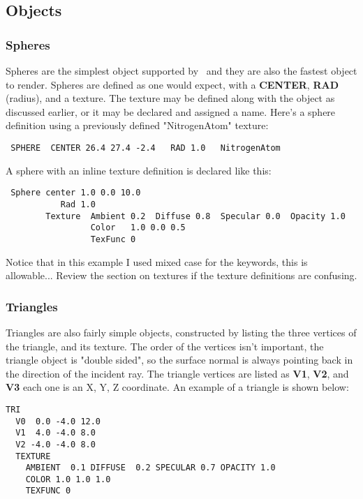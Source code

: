 \subsection{Objects}

\subsubsection{Spheres}
  Spheres are the simplest object supported by \RAY\ and they are
also the fastest object to render.  Spheres are defined as one would expect,
with a {\bf CENTER}, {\bf RAD} (radius), and a texture.  The texture may
be defined along with the object as discussed earlier, or it may be declared
and assigned a name.  
Here's a sphere definition using a previously defined "NitrogenAtom" texture:
\begin{verbatim}
 SPHERE  CENTER 26.4 27.4 -2.4   RAD 1.0   NitrogenAtom 
\end{verbatim}
A sphere with an inline texture definition is declared like this:
\begin{verbatim}
 Sphere center 1.0 0.0 10.0   
           Rad 1.0
        Texture  Ambient 0.2  Diffuse 0.8  Specular 0.0  Opacity 1.0
                 Color   1.0 0.0 0.5
                 TexFunc 0
\end{verbatim}
Notice that in this example I used mixed case for the keywords, this is
allowable...
Review the section on textures if the texture definitions are confusing.

\subsubsection{Triangles}
  Triangles are also fairly simple objects, constructed by listing the
three vertices of the triangle, and its texture.  The order of the
vertices isn't important, the triangle object is "double sided", so the
surface normal is always pointing back in the direction of the incident ray.
The triangle vertices are listed as {\bf V1}, {\bf V2}, and {\bf V3} each one
is an X, Y, Z coordinate.  An example of a triangle is shown below:
\begin{verbatim}
TRI
  V0  0.0 -4.0 12.0
  V1  4.0 -4.0 8.0
  V2 -4.0 -4.0 8.0
  TEXTURE
    AMBIENT  0.1 DIFFUSE  0.2 SPECULAR 0.7 OPACITY 1.0
    COLOR 1.0 1.0 1.0
    TEXFUNC 0
\end{verbatim}

